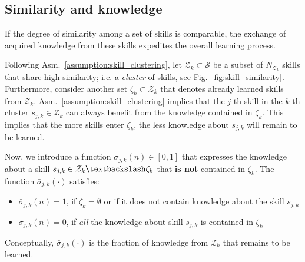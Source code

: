 \subsection{Similarity and knowledge}
\begin{tcolorbox}
	\begin{assumption}\label{assumption:skill_clustering} If the degree of similarity among a set of skills is comparable, the exchange of acquired knowledge from these skills expedites the overall learning process.
		\end{assumption}
\end{tcolorbox}
Following Asm.~\ref{assumption:skill_clustering}, let $\mathcal{Z}_k \subset \mathcal{S}$ be a subset of $N_{\mathcal{Z}_k}$ skills that share high similarity; i.e. a \emph{cluster} of skills, see Fig.~\ref{fig:skill_similarity}. Furthermore, consider another set $\mathcal{\zeta}_k \subset \mathcal{Z}_k$ that denotes already learned skills from $\mathcal{Z}_k$. Asm.~\ref{assumption:skill_clustering} implies that the $j$-th skill in the $k$-th cluster $s_{j,k} \in \mathcal{Z}_k$ can always benefit from the knowledge contained in $\mathcal{\zeta}_k$. This implies that the more skills enter $\mathcal{\zeta}_k$, the less knowledge about $ s_{j,k} $ will remain to be learned.

Now, we introduce a function $\bar{\sigma}_{j,k}\left(n\right)\in [0,1]$ that expresses the knowledge about a skill $s_{j,k} \in \mathcal{Z}_k\textbackslash \mathcal{\zeta}_k$ that \textbf{is not} contained in $\mathcal{\zeta}_k$. The function $\bar{\sigma}_{j,k}(\cdot)$ satisfies:
\begin{itemize}
	\item $\bar{\sigma}_{j,k}\left(n\right) = 1$, if $\mathcal{\zeta}_k=\emptyset$ or if it does not contain knowledge about the skill $s_{j,k}$
	\item $\bar{\sigma}_{j,k}\left(n\right) = 0$, if \emph{all} the knowledge about skill $s_{j,k}$ is contained in $\mathcal{\zeta}_k$
\end{itemize} 
Conceptually, $\bar{\sigma}_ {j,k}\left(\cdot\right)$ is the fraction of knowledge from ${\mathcal{Z}_k}$ that remains to be learned.

